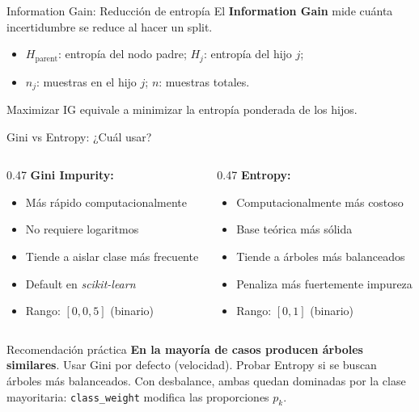 \documentclass[aspectratio=169,12pt]{beamer}
\newcommand{\colhead}[1]{\textbf{#1}\par\vspace{2pt}}
\begin{document}
\begin{frame}{Information Gain: Reducción de entropía}
  El \textbf{Information Gain} mide cuánta incertidumbre se reduce al hacer un split.
  \relax{\large\[ IG = H_{\text{parent}} - \sum_{j \in \{\text{left, right}\}} \frac{n_j}{n} H_j \]}
  \small
  \begin{itemize}
    \item $H_{\text{parent}}$: entropía del nodo padre; $H_j$: entropía del hijo $j$;
    \item $n_j$: muestras en el hijo $j$; $n$: muestras totales.
  \end{itemize}
  \begin{goldbox}[Objetivo]
    Maximizar IG equivale a minimizar la entropía ponderada de los hijos.
  \end{goldbox}
\end{frame}

\begin{frame}{Gini vs Entropy: ¿Cuál usar?}
  \begin{columns}[T]
    \begin{column}{0.47\textwidth}
      \colhead{Gini Impurity:}
      \small
      \begin{itemize}
        \item Más rápido computacionalmente
        \item No requiere logaritmos
        \item Tiende a aislar clase más frecuente
        \item Default en \emph{scikit-learn}
        \item Rango: $[0, 0{,}5]$ (binario)
      \end{itemize}
    \end{column}
    \begin{column}{0.47\textwidth}
      \colhead{Entropy:}
      \small
      \begin{itemize}
        \item Computacionalmente más costoso
        \item Base teórica más sólida
        \item Tiende a árboles más balanceados
        \item Penaliza más fuertemente impureza
        \item Rango: $[0, 1]$ (binario)
      \end{itemize}
    \end{column}
  \end{columns}
  \begin{block}{Recomendación práctica}\footnotesize
    \textbf{En la mayoría de casos producen árboles similares}. Usar Gini por defecto (velocidad). Probar Entropy si se buscan árboles más balanceados. Con desbalance, ambas quedan dominadas por la clase mayoritaria: \texttt{class\_weight} modifica las proporciones $p_k$.
  \end{block}
\end{frame}
\end{document}
